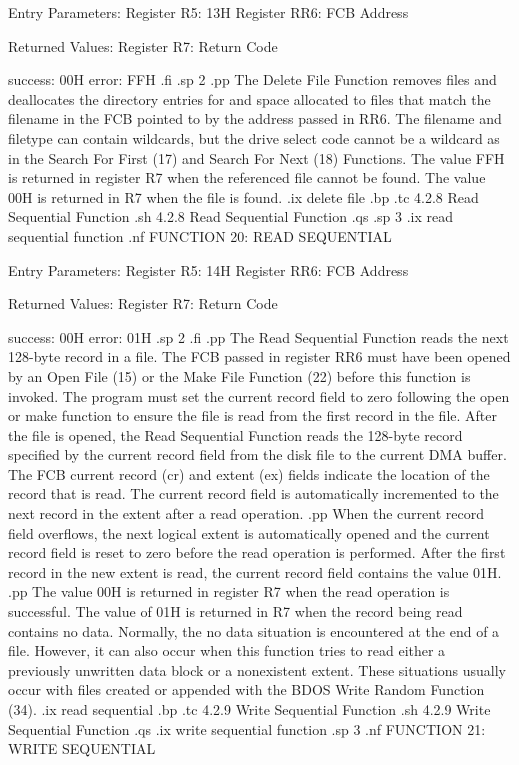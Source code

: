                 Entry Parameters:
                   Register   R5:  13H
                   Register  RR6:  FCB Address

                Returned  Values:
                   Register   R7:  Return Code

                                   success:  00H
                                     error:  FFH
.fi
.sp 2
.pp
The Delete File Function removes files and deallocates the
directory entries for and space allocated to files that match the
filename in the FCB pointed to by the address passed in  RR6. The
filename and filetype can contain wildcards, but the drive select
code cannot be a wildcard as in the Search For First (17) and
Search For Next (18) Functions.  The value FFH is returned in
register   R7 when the referenced file cannot be found.  The
value 00H is returned in   R7 when the file is found. 
.ix delete file
.bp
.tc         4.2.8  Read Sequential Function
.sh
4.2.8  Read Sequential Function
.qs
.sp 3
.ix read sequential function
.nf
                 FUNCTION 20:  READ SEQUENTIAL

                Entry Parameters:
                   Register   R5:  14H
                   Register  RR6:  FCB Address

                Returned  Values:
                   Register   R7:  Return Code

                                   success:  00H
                                     error:  01H
.sp 2
.fi
.pp
The Read Sequential Function reads the next 128-byte record in a 
file.  The FCB passed in register  RR6 must have been opened by
an Open File (15) or the Make File Function (22) before this 
function is invoked. The program must set the current record
field to zero following the open or make function to ensure the
file is read from the first record in the file. After the file 
is opened, the Read
Sequential Function reads the 128-byte record specified by the 
current record field from the disk
file to the current DMA buffer. The FCB current record (cr) and
extent (ex) fields indicate the location of the record 
that is read. The current record field is automatically
incremented to the next record in the extent after a read
operation.
.pp
When the current record field overflows, the next
logical extent is automatically opened and the current record
field is reset to zero before the read operation is performed.  After
the first record in the new extent is read, the current record field 
contains the value 01H.  
.pp
The value 00H is returned in register   R7 when the read
operation is successful.  The value of 01H is returned in   R7
when the record being read contains no data. Normally, the no data
situation is encountered at the end of a file.  However, it can
also occur when this function tries to read either a previously
unwritten data block or a nonexistent extent. These situations
usually occur with files created or appended with the BDOS
Write Random Function (34). 
.ix read sequential
.bp
.tc         4.2.9  Write Sequential Function 
.sh 
4.2.9  Write Sequential Function 
.qs
.ix write sequential function
.sp 3
.nf
                 FUNCTION 21:  WRITE SEQUENTIAL

